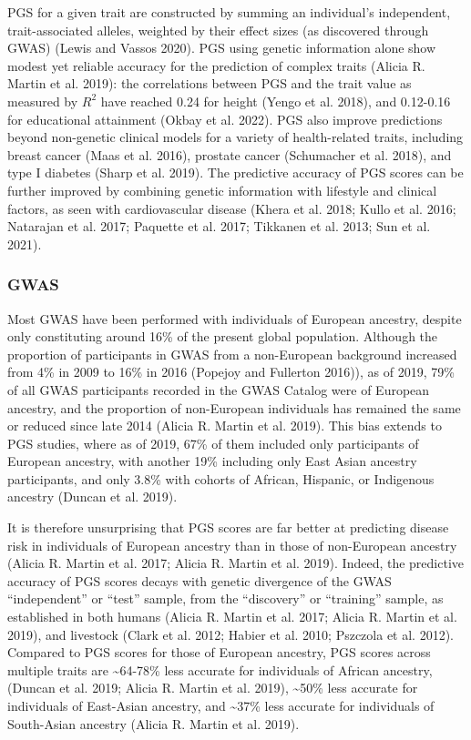 \documentclass[
]{book}
\begin{document}
PGS for a given trait are constructed by summing an individual's independent, trait-associated alleles, weighted by their effect sizes (as discovered through GWAS) (Lewis and Vassos 2020). PGS using genetic information alone show modest yet reliable accuracy for the prediction of complex traits (Alicia R. Martin et al. 2019): the correlations between PGS and the trait value as measured by \(R^2\) have reached 0.24 for height (Yengo et al. 2018), and 0.12-0.16 for educational attainment (Okbay et al. 2022). PGS also improve predictions beyond non-genetic clinical models for a variety of health-related traits, including breast cancer (Maas et al. 2016), prostate cancer (Schumacher et al. 2018), and type I diabetes (Sharp et al. 2019). The predictive accuracy of PGS scores can be further improved by combining genetic information with lifestyle and clinical factors, as seen with cardiovascular disease (Khera et al. 2018; Kullo et al. 2016; Natarajan et al. 2017; Paquette et al. 2017; Tikkanen et al. 2013; Sun et al. 2021).

\hypertarget{gwas}{%
\subsubsection{GWAS}\label{gwas}}

Most GWAS have been performed with individuals of European ancestry, despite only constituting around 16\% of the present global population. Although the proportion of participants in GWAS from a non-European background increased from 4\% in 2009 to 16\% in 2016 (Popejoy and Fullerton 2016)), as of 2019, 79\% of all GWAS participants recorded in the GWAS Catalog were of European ancestry, and the proportion of non-European individuals has remained the same or reduced since late 2014 (Alicia R. Martin et al. 2019). This bias extends to PGS studies, where as of 2019, 67\% of them included only participants of European ancestry, with another 19\% including only East Asian ancestry participants, and only 3.8\% with cohorts of African, Hispanic, or Indigenous ancestry (Duncan et al. 2019).

It is therefore unsurprising that PGS scores are far better at predicting disease risk in individuals of European ancestry than in those of non-European ancestry (Alicia R. Martin et al. 2017; Alicia R. Martin et al. 2019). Indeed, the predictive accuracy of PGS scores decays with genetic divergence of the GWAS ``independent'' or ``test'' sample, from the ``discovery'' or ``training'' sample, as established in both humans (Alicia R. Martin et al. 2017; Alicia R. Martin et al. 2019), and livestock (Clark et al. 2012; Habier et al. 2010; Pszczola et al. 2012). Compared to PGS scores for those of European ancestry, PGS scores across multiple traits are \textasciitilde64-78\% less accurate for individuals of African ancestry, (Duncan et al. 2019; Alicia R. Martin et al. 2019), \textasciitilde50\% less accurate for individuals of East-Asian ancestry, and \textasciitilde37\% less accurate for individuals of South-Asian ancestry (Alicia R. Martin et al. 2019).
\end{document}

